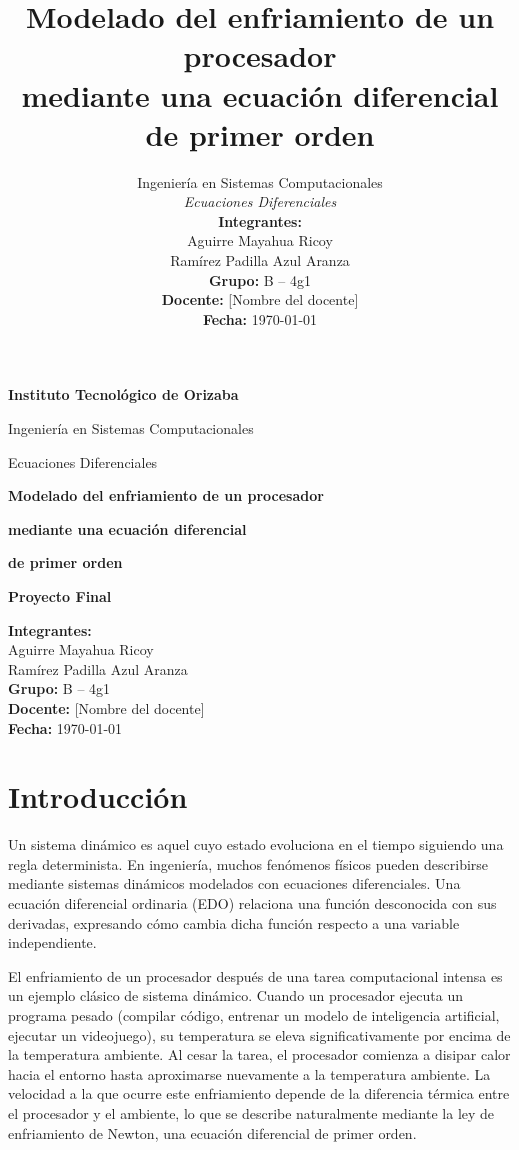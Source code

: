 \documentclass[12pt,a4paper]{article}
\title{Modelado del enfriamiento de un procesador\\mediante una ecuación diferencial de primer orden}
\author{
  Ingeniería en Sistemas Computacionales \\[4pt]
  \small\textit{Ecuaciones Diferenciales} \\[8pt]
  \textbf{Integrantes:} \\
  Aguirre Mayahua Ricoy \\
  Ramírez Padilla Azul Aranza \\[8pt]
  \textbf{Grupo:} B -- 4g1 \\[4pt]
  \textbf{Docente:} [Nombre del docente] \\[4pt]
  \textbf{Fecha:} \today
}
\date{}
\begin{document}
\begin{titlepage}
  \centering
  \vspace*{1.5cm}
  {\LARGE\textbf{Instituto Tecnológico de Orizaba}\par}
  \vspace{0.8cm}
  {\Large Ingeniería en Sistemas Computacionales\par}
  \vspace{0.5cm}
  {\large Ecuaciones Diferenciales\par}
  \vspace{1.5cm}
  {\Huge\textbf{Modelado del enfriamiento de un procesador}\par}
  {\Huge\textbf{mediante una ecuación diferencial}\par}
  {\Huge\textbf{de primer orden}\par}
  \vspace{1.5cm}
  {\Large\textbf{Proyecto Final}\par}
  \vspace{1cm}
  \begin{flushleft}
    \textbf{Integrantes:}\\[4pt]
    Aguirre Mayahua Ricoy \\[2pt]
    Ramírez Padilla Azul Aranza \\[12pt]
    \textbf{Grupo:} B -- 4g1 \\[4pt]
    \textbf{Docente:} [Nombre del docente] \\[4pt]
    \textbf{Fecha:} \today
  \end{flushleft}
  \vfill
\end{titlepage}

\section{Introducción}

Un sistema dinámico es aquel cuyo estado evoluciona en el tiempo siguiendo una regla determinista. En ingeniería, muchos fenómenos físicos pueden describirse mediante sistemas dinámicos modelados con ecuaciones diferenciales. Una ecuación diferencial ordinaria (EDO) relaciona una función desconocida con sus derivadas, expresando cómo cambia dicha función respecto a una variable independiente.

El enfriamiento de un procesador después de una tarea computacional intensa es un ejemplo clásico de sistema dinámico. Cuando un procesador ejecuta un programa pesado (compilar código, entrenar un modelo de inteligencia artificial, ejecutar un videojuego), su temperatura se eleva significativamente por encima de la temperatura ambiente. Al cesar la tarea, el procesador comienza a disipar calor hacia el entorno hasta aproximarse nuevamente a la temperatura ambiente. La velocidad a la que ocurre este enfriamiento depende de la diferencia térmica entre el procesador y el ambiente, lo que se describe naturalmente mediante la ley de enfriamiento de Newton, una ecuación diferencial de primer orden.
\end{document}
